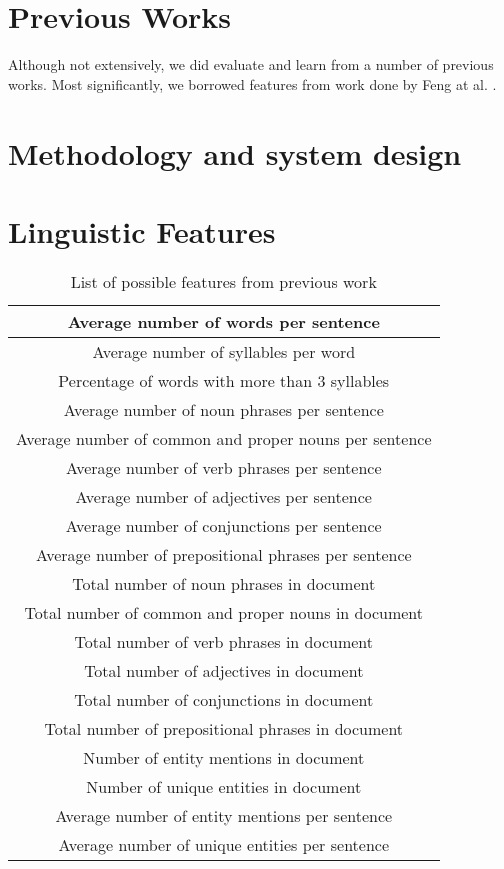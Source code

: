 \documentclass[]{article}
\begin{document}
\section{Previous Works}

Although not extensively, we did evaluate and learn from a number of previous works.
Most significantly, we borrowed features from work done by Feng at al. \cite{feng2009cognitively}.

\section{Methodology and system design}

\section{Linguistic Features}

\begin{table}[!htbp]
	\begin{center}
		\begin{tabular}{| c |} \hline
			Average number of words per sentence \\ \hline
			Average number of syllables per word \\ \hline
			Percentage of words with more than 3 syllables \\ \hline
			Average number of noun phrases per sentence \\ \hline
			Average number of common and proper nouns per sentence \\ \hline
			Average number of verb phrases per sentence \\ \hline
			Average number of adjectives per sentence \\  \hline
			Average number of conjunctions per sentence \\ \hline
			Average number of prepositional phrases per sentence \\ \hline
			Total number of noun phrases in document \\ \hline
			Total number of common and proper nouns in document \\ \hline
			Total number of verb phrases in document \\ \hline
			Total number of adjectives in document \\ \hline
			Total number of conjunctions in document \\ \hline
			Total number of prepositional phrases in document \\ \hline
			Number of entity mentions in document \\ \hline
			Number of unique entities in document \\ \hline
			Average number of entity mentions per sentence \\ \hline
			Average number of unique entities per sentence \\ \hline
		\end{tabular}
	\end{center}
	\caption{List of possible features from previous work\cite{}}
	\label{table:features1}
\end{table}
\end{document}
